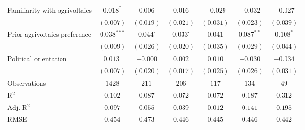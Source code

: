 \begin{center}
\begin{small}
\begin{longtable}{l@{} c@{} c@{} c@{} c@{} c@{} c@{}}
\quad Familiarity with agrivoltaics & $0.018^{*}$     & $0.006$         & $0.016$         & $-0.029$  & $-0.032$      & $-0.027$        \\
                                    & $(0.007)$       & $(0.019)$       & $(0.021)$       & $(0.031)$ & $(0.023)$     & $(0.039)$       \\
\quad Prior agrivoltaics preference & $0.038^{***}$   & $0.044^{\cdot}$ & $0.033^{\cdot}$ & $0.041$   & $0.087^{**}$  & $0.108^{*}$     \\
                                    & $(0.009)$       & $(0.026)$       & $(0.020)$       & $(0.035)$ & $(0.029)$     & $(0.044)$       \\
\quad Political orientation         & $0.013^{\cdot}$ & $-0.000$        & $0.002$         & $0.010$   & $-0.030$      & $-0.034$        \\
                                    & $(0.007)$       & $(0.020)$       & $(0.017)$       & $(0.025)$ & $(0.026)$     & $(0.031)$       \\
\hline
Observations                        & $1428$          & $211$           & $206$           & $117$     & $134$         & $49$            \\
R$^2$                               & $0.102$         & $0.087$         & $0.072$         & $0.072$   & $0.187$       & $0.312$         \\
Adj. R$^2$                          & $0.097$         & $0.055$         & $0.039$         & $0.012$   & $0.141$       & $0.195$         \\
RMSE                                & $0.454$         & $0.473$         & $0.446$         & $0.445$   & $0.446$       & $0.442$         \\
\end{longtable}
\end{small}
\end{center}
